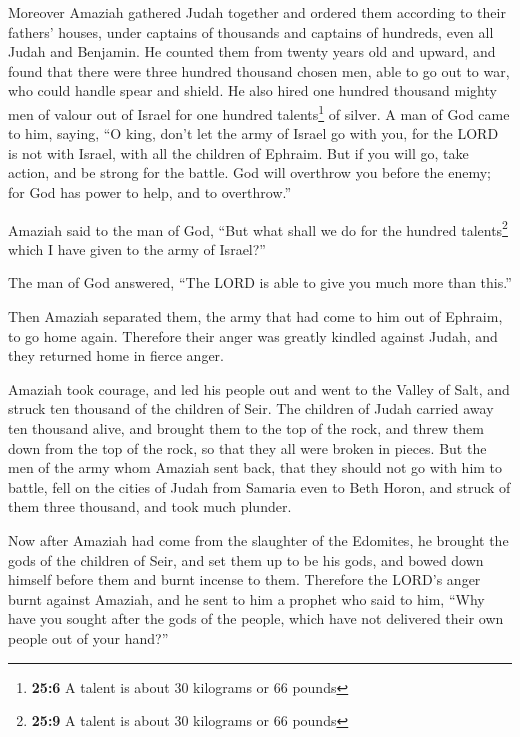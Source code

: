  Moreover Amaziah gathered Judah together and ordered them
according to their fathers' houses, under captains of thousands and
captains of hundreds, even all Judah and Benjamin. He counted them from
twenty years old and upward, and found that there were three hundred
thousand chosen men, able to go out to war, who could handle spear and
shield.  He also hired one hundred thousand mighty men of
valour out of Israel for one hundred talents\footnote{\textbf{25:6} A
  talent is about 30 kilograms or 66 pounds} of silver.  A
man of God came to him, saying, ``O king, don't let the army of Israel
go with you, for the LORD is not with Israel, with all the children of
Ephraim.  But if you will go, take action, and be strong
for the battle. God will overthrow you before the enemy; for God has
power to help, and to overthrow.''

 Amaziah said to the man of God, ``But what shall we do
for the hundred talents\footnote{\textbf{25:9} A talent is about 30
  kilograms or 66 pounds} which I have given to the army of Israel?''

The man of God answered, ``The LORD is able to give you much more than
this.''

 Then Amaziah separated them, the army that had come to
him out of Ephraim, to go home again. Therefore their anger was greatly
kindled against Judah, and they returned home in fierce anger.

 Amaziah took courage, and led his people out and went to
the Valley of Salt, and struck ten thousand of the children of Seir.
 The children of Judah carried away ten thousand alive,
and brought them to the top of the rock, and threw them down from the
top of the rock, so that they all were broken in pieces. 
But the men of the army whom Amaziah sent back, that they should not go
with him to battle, fell on the cities of Judah from Samaria even to
Beth Horon, and struck of them three thousand, and took much plunder.

 Now after Amaziah had come from the slaughter of the
Edomites, he brought the gods of the children of Seir, and set them up
to be his gods, and bowed down himself before them and burnt incense to
them.  Therefore the LORD's anger burnt against Amaziah,
and he sent to him a prophet who said to him, ``Why have you sought
after the gods of the people, which have not delivered their own people
out of your hand?''

